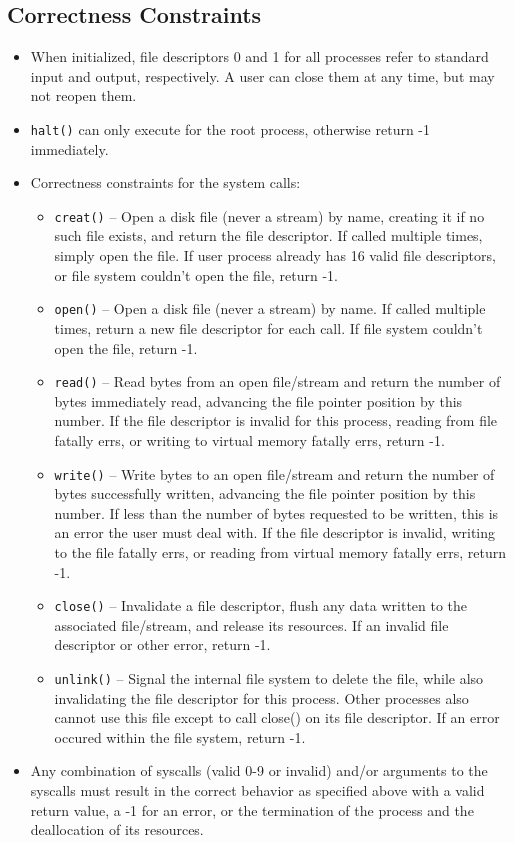 \documentclass{article}
\begin{document}
\subsection{Correctness Constraints}
\begin{itemize}
\item When initialized, file descriptors 0 and 1 for all processes refer to standard input and output, respectively. A user can close them at any time, but may not reopen them.
\item \texttt{halt()} can only execute for the root process, otherwise return -1 immediately.
\item Correctness constraints for the system calls:
\begin{itemize}
\item \texttt{creat()} -- Open a disk file (never a stream) by name, creating it if no such file exists, and return the file descriptor. If called multiple times, simply open the file. If user process already has 16 valid file descriptors, or file system couldn't open the file, return -1.
\item \texttt{open()} -- Open a disk file (never a stream) by name. If called multiple times, return a new file descriptor for each call. If file system couldn't open the file, return -1.
\item \texttt{read()} -- Read bytes from an open file/stream and return the number of bytes immediately read, advancing the file pointer position by this number. If the file descriptor is invalid for this process, reading from file fatally errs, or writing to virtual memory fatally errs, return -1. 
\item \texttt{write()} -- Write bytes to an open file/stream and return the number of bytes successfully written, advancing the file pointer position by this number. If less than the number of bytes requested to be written, this is an error the user must deal with. If the file descriptor is invalid, writing to the file fatally errs, or reading from virtual memory fatally errs, return -1.
\item \texttt{close()} -- Invalidate a file descriptor, flush any data written to the associated file/stream, and release its resources. If an invalid file descriptor or other error, return -1.
\item \texttt{unlink()} -- Signal the internal file system to delete the file, while also invalidating the file descriptor for this process. Other processes also cannot use this file except to call close() on its file descriptor. If an error occured within the file system, return -1.
\end{itemize}
\item Any combination of syscalls (valid 0-9 or invalid) and/or arguments to the syscalls must result in the correct behavior as specified above with a valid return value, a -1 for an error, or the termination of the process and the deallocation of its resources.
\end{itemize}
\end{document}
